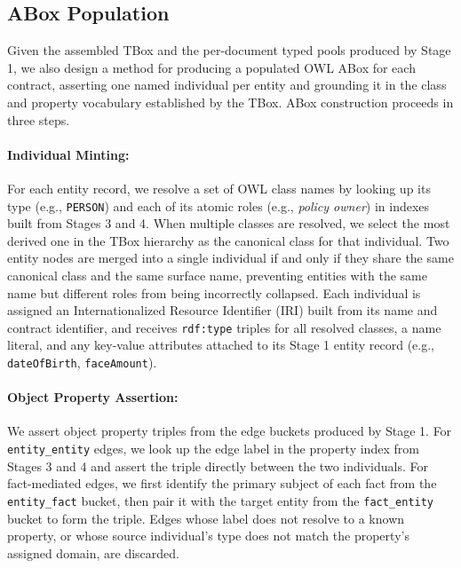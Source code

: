 \documentclass[sigconf]{acmart}
\begin{document}
\subsection*{ABox Population}

Given the assembled TBox and the per-document typed pools produced by Stage 1, we also design a method for producing a populated OWL ABox for each contract, asserting one named individual per entity and grounding it in the class and property vocabulary established by the TBox. ABox construction proceeds in three steps.

\vspace{-0.5em}
\paragraph{\textbf{Individual Minting:}}
For each entity record, we resolve a set of OWL class names by looking up its type (e.g., \texttt{PERSON}) and each of its atomic roles (e.g., \textit{policy owner}) in indexes built from Stages 3 and 4. When multiple classes are resolved, we select the most derived one in the TBox hierarchy as the canonical class for that individual. Two entity nodes are merged into a single individual if and only if they share the same canonical class and the same surface name, preventing entities with the same name but different roles from being incorrectly collapsed. Each individual is assigned an Internationalized Resource Identifier (IRI) built from its name and contract identifier, and receives \texttt{rdf:type} triples for all resolved classes, a name literal, and any key-value attributes attached to its Stage 1 entity record (e.g., \texttt{dateOfBirth}, \texttt{faceAmount}).

\vspace{-0.5em}
\paragraph{\textbf{Object Property Assertion:}}
We assert object property triples from the edge buckets produced by Stage 1. For \texttt{entity\_entity} edges, we look up the edge label in the property index from Stages 3 and 4 and assert the triple directly between the two individuals. For fact-mediated edges, we first identify the primary subject of each fact from the \texttt{entity\_fact} bucket, then pair it with the target entity from the \texttt{fact\_entity} bucket to form the triple. Edges whose label does not resolve to a known property, or whose source individual's type does not match the property's assigned domain, are discarded.
\end{document}
